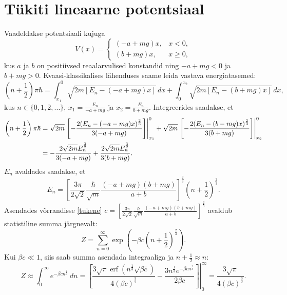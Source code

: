 \documentclass{trkut}%
\DeclareMathOperator{\erf}{erf}
\begin{document}
\section{Tükiti lineaarne potentsiaal}
Vaadeldakse potentsiaali kujuga
\begin{equation}
    V(x)=\begin{cases}
        (-a+mg)x, & x<0,\\
        (b+mg)x, & x\ge0,
    \end{cases}
\end{equation}
kus $a$ ja $b$ on positiivsed reaalarvulised konstandid ning $-a+mg<0$ ja $b+mg>0$.
Kvaasi-klassikalises lähenduses saame leida vastava energiatasemed:
\begin{equation}
    \left( n+\frac{1}{2}\right)\pi \hbar = \int_{x_1}^{0} \sqrt{2m[E_n-(-a+mg)x]}\, dx + \int_{0}^{x_2} \sqrt{2m[E_n-(b+mg)x]} \, dx,
\end{equation}
kus \(n \in \{0, 1, 2, ...\}\), \(x_1=\frac{E_n}{-a+mg}\) ja \(x_2=\frac{E_n}{b+mg}\). Integreerides saadakse, et
\begin{align}
    \left(n+\frac{1}{2}\right)\pi \hbar &= \sqrt{2m}\left.\left[-\frac{2(E_n-(-a-mg)x)^\frac{2}{3}}{3(-a+mg)}\right]\right|^0_{x_1} + \sqrt{2m}\left.\left[-\frac{2(E_n-(b-mg)x)^\frac{2}{3}}{3(b+mg)}\right]\right|^{0}_{x_2} \notag \\
    &= -\frac{2\sqrt{2m}E_n^{\frac{3}{2}}}{3(-a+mg)}+\frac{2\sqrt{2m}E_n^{\frac{3}{2}}}{3(b+mg)}.
\end{align}
$E_n$ avaldades saadakse, et
\begin{equation}
    E_n =\left[\frac{3\pi}{2\sqrt{2}} \frac{\hbar}{\sqrt{m}} \frac{(-a+mg)(b+mg)}{a+b}\right]^{\frac{2}{3}} \left(n+\frac{1}{2}\right)^{\frac{2}{3}} . \label{tukene}
\end{equation}
Asendades võrrandisse \eqref{tukene} $c=\left[\frac{3\pi}{2\sqrt{2}} \frac{\hbar}{\sqrt{m}} \frac{(-a+mg)(b+mg)}{a+b}\right]^{\frac{2}{3}}$ avaldub statistiline summa järgnevalt:
\begin{equation}
    Z=\sum_{n=0}^{\infty} \exp \left( -\beta c \left(n+\frac{1}{2}\right)^\frac{2}{3} \right).
    \label{linsum}
\end{equation}
Kui $\beta c\ll 1$, siis saab summa asendada integraaliga ja $n+\frac{1}{2}\approx n$:
\begin{equation}
    Z \approx \int_0^\infty e^{-\beta c n^\frac{2}{3}} \, dn = \left.\left[ \frac{3\sqrt{\pi}  \erf{\left( {n}^\frac{1}{3} \sqrt{\beta c}\right)} }{4 (\beta c)^\frac{3}{2}}-\frac{3n^\frac{1}{3} e^{-\beta cn^\frac{2}{3}}}{2 \beta c }\right]\right|^{\infty}_{0} =\frac{3\sqrt{\pi}}{4(\beta c)^\frac{3}{2}} .
    \label{linpart}
\end{equation}
\end{document}
